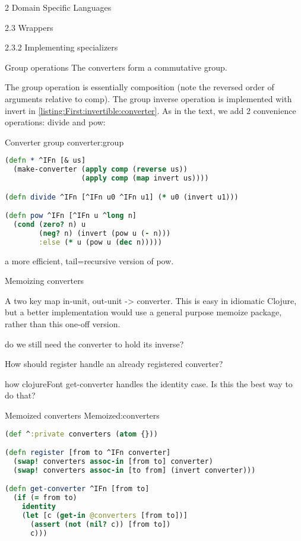 \documentclass[12pt]{PalisadesLakesBook}
\begin{document}
\begin{plSection}{2 Domain Specific Languages}
\begin{plSection}{2.3 Wrappers}
\begin{plSection}{2.3.2 Implementing specializers}
\begin{plSection}{Group operations}
The converters form a commutative group.

The group operation is essentially composition
(note the reversed order of arguments relative to 
{\clojureFont comp}).
The group inverse operation is 
implemented with {\clojureFont invert}
in \cref{listing:First:invertible:converter}.
As in the text, we add 2 convenience operations:
{\clojureFont divide} and {\clojureFont pow}:
\begin{plListing}
{Converter group}
{converter:group}
\begin{lstlisting}[language=clojure]
(defn * ^IFn [& us]
  (make-converter (apply comp (reverse us))
                  (apply comp (map invert us))))

(defn divide ^IFn [^IFn u0 ^IFn u1] (* u0 (invert u1)))

(defn pow ^IFn [^IFn u ^long n]
  (cond (zero? n) u
        (neg? n) (invert (pow u (- n)))
        :else (* u (pow u (dec n)))))
\end{lstlisting}
\end{plListing}
\TODO a more efficient, tail=recursive version 
of {\clojureFont pow}.

\end{plSection}%
\begin{plSection}{Memoizing converters}

A two key map in-unit, out-unit -> converter.
This is easy in idiomatic Clojure,
but a better implementation would use a general purpose
memoize package, rather than this one-off version.

\TODO do we still need the converter to hold its inverse?

\TODO How should {\clojureFont register} handle an already
registered converter?

\NOTE how {clojureFont get-converter} handles the identity case.
Is this the best way to do that?

\begin{plListing}
{Memoized converters}
{Memoized:converters}
\begin{lstlisting}[language=clojure]
(def ^:private converters (atom {}))

(defn register [from to ^IFn converter]
  (swap! converters assoc-in [from to] converter)
  (swap! converters assoc-in [to from] (invert converter)))

(defn get-converter ^IFn [from to]
  (if (= from to)
    identity
    (let [c (get-in @converters [from to])]
      (assert (not (nil? c)) [from to])
      c)))


\end{lstlisting}
\end{plListing}
\end{plSection}
\end{plSection}
\end{plSection}
\end{plSection}
\end{document}
